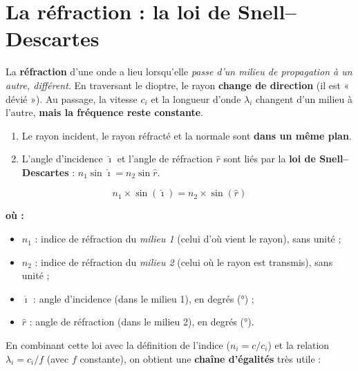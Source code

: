 \documentclass[11pt,a4paper]{article}
\newenvironment{ou}{%
  \par\smallskip\noindent\textbf{où :}\nopagebreak
  \begin{itemize}[leftmargin=1.8em,topsep=2pt,itemsep=1.5pt,parsep=0pt]}%
  {\end{itemize}}
\newcommand{\angi}{\hat{\imath}}     %
\newcommand{\angr}{\hat{r}}          %
\begin{document}
\section{La réfraction : la loi de Snell–Descartes}
\begin{definition}[réfraction]
La \textbf{réfraction} d'une onde a lieu lorsqu'elle \emph{passe d'un milieu de propagation à un
autre, différent}. En traversant le dioptre, le rayon \textbf{change de direction} (il est « dévié »).
Au passage, la vitesse $c_i$ et la longueur d'onde $\lambda_i$ changent d'un milieu à l'autre,
\textbf{mais la fréquence reste constante}.
\end{definition}

\begin{theoreme}
\begin{enumerate}[label=(\roman*),leftmargin=2.1em,topsep=2pt]
  \item Le rayon incident, le rayon réfracté et la normale sont \textbf{dans un même plan}.
  \item L'angle d'incidence $\angi$ et l'angle de réfraction $\angr$ sont liés par la
        \textbf{loi de Snell–Descartes} : $n_1\sin\angi = n_2\sin\angr$.
\end{enumerate}
\end{theoreme}

\begin{formule}
\[ \boxed{\,n_1 \times \sin(\angi) = n_2 \times \sin(\angr)\,} \]
\begin{ou}
  \item $n_1$ : indice de réfraction du \emph{milieu 1} (celui d'où vient le rayon), sans unité ;
  \item $n_2$ : indice de réfraction du \emph{milieu 2} (celui où le rayon est transmis), sans unité ;
  \item $\angi$ : angle d'incidence (dans le milieu 1), en degrés (\si{\degree}) ;
  \item $\angr$ : angle de réfraction (dans le milieu 2), en degrés (\si{\degree}).
\end{ou}
\end{formule}

En combinant cette loi avec la définition de l'indice ($n_i = c/c_i$) et la relation
$\lambda_i = c_i/f$ (avec $f$ constante), on obtient une \textbf{chaîne d'égalités} très utile :
\end{document}
